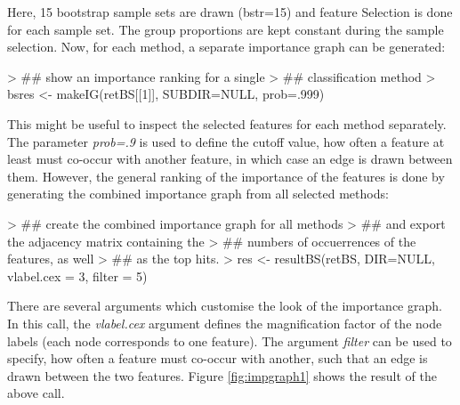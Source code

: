 \documentclass[11pt,a4paper]{article}
\begin{document}
Here, 15 bootstrap sample sets are drawn (bstr=15) and feature Selection is done for each sample set. The group proportions are kept constant during the sample selection. Now, for each method, a separate importance graph can be generated:

\begin{Schunk}
\begin{Sinput}
> ## show an importance ranking for a single 
> ## classification method
> bsres <- makeIG(retBS[[1]], SUBDIR=NULL, prob=.999)
\end{Sinput}
\end{Schunk}

This might be useful to inspect the selected features for each method separately. The parameter \emph{prob=.9} is used to define the cutoff value, how often a feature at least must co-occur with another feature, in which case an edge is drawn between them. However, the general ranking of the importance of the features is done by generating the combined importance graph from all selected methods:

\begin{Schunk}
\begin{Sinput}
> ## create the combined importance graph for all methods
> ## and export the adjacency matrix containing the 
> ## numbers of occuerrences of the features, as well 
> ## as the top hits.
> res <- resultBS(retBS, DIR=NULL, vlabel.cex = 3, filter = 5)
\end{Sinput}
\end{Schunk}

There are several arguments which customise the look of the importance graph. In this call, the \emph{vlabel.cex} argument defines the magnification factor of the node labels (each node corresponds to one feature). The argument \emph{filter} can be used to specify, how often a feature must co-occur with another, such that an edge is drawn between the two features. Figure \ref{fig:impgraph1} shows the result of the above call.
\end{document}
